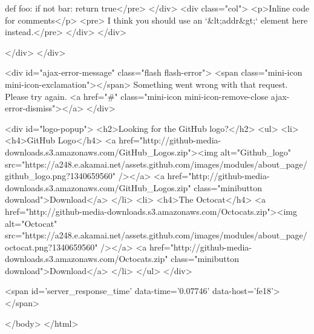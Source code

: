     def foo:
      if not bar:
        return true</pre>
    </div>
    <div class="col">
      <p>Inline code for comments</p>
      <pre>
I think you should use an
`&lt;addr&gt;` element here instead.</pre>
    </div>
  </div>

  </div>
</div>


    <div id="ajax-error-message" class="flash flash-error">
      <span class="mini-icon mini-icon-exclamation"></span>
      Something went wrong with that request. Please try again.
      <a href="#" class="mini-icon mini-icon-remove-close ajax-error-dismiss"></a>
    </div>

    <div id="logo-popup">
      <h2>Looking for the GitHub logo?</h2>
      <ul>
        <li>
          <h4>GitHub Logo</h4>
          <a href="http://github-media-downloads.s3.amazonaws.com/GitHub_Logos.zip"><img alt="Github_logo" src="https://a248.e.akamai.net/assets.github.com/images/modules/about_page/github_logo.png?1340659560" /></a>
          <a href="http://github-media-downloads.s3.amazonaws.com/GitHub_Logos.zip" class="minibutton download">Download</a>
        </li>
        <li>
          <h4>The Octocat</h4>
          <a href="http://github-media-downloads.s3.amazonaws.com/Octocats.zip"><img alt="Octocat" src="https://a248.e.akamai.net/assets.github.com/images/modules/about_page/octocat.png?1340659560" /></a>
          <a href="http://github-media-downloads.s3.amazonaws.com/Octocats.zip" class="minibutton download">Download</a>
        </li>
      </ul>
    </div>

    
    
    <span id='server_response_time' data-time='0.07746' data-host='fe18'></span>
    
  </body>
</html>

